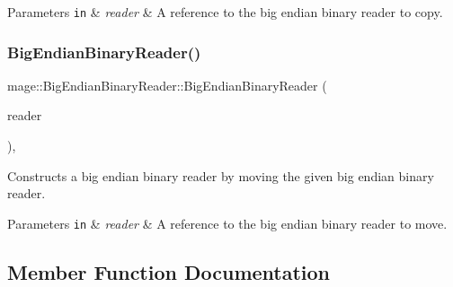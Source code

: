 \begin{DoxyParams}[1]{Parameters}
\mbox{\tt in}  & {\em reader} & A reference to the big endian binary reader to copy. \\
\hline
\end{DoxyParams}
\hypertarget{classmage_1_1_big_endian_binary_reader_a3cb2fbd205854cf69c36054a2003e80e}{}\label{classmage_1_1_big_endian_binary_reader_a3cb2fbd205854cf69c36054a2003e80e} 
\subsubsection{\texorpdfstring{Big\+Endian\+Binary\+Reader()}{BigEndianBinaryReader()}\hspace{0.1cm}{\footnotesize\ttfamily [3/3]}}
{\footnotesize\ttfamily mage\+::\+Big\+Endian\+Binary\+Reader\+::\+Big\+Endian\+Binary\+Reader (\begin{DoxyParamCaption}\item[{\hyperlink{classmage_1_1_big_endian_binary_reader}{Big\+Endian\+Binary\+Reader} \&\&}]{reader }\end{DoxyParamCaption})\hspace{0.3cm}{\ttfamily [protected]}, {\ttfamily [default]}}

Constructs a big endian binary reader by moving the given big endian binary reader.


\begin{DoxyParams}[1]{Parameters}
\mbox{\tt in}  & {\em reader} & A reference to the big endian binary reader to move. \\
\hline
\end{DoxyParams}


\subsection{Member Function Documentation}
\hypertarget{classmage_1_1_big_endian_binary_reader_a801558f27606dbc681809178aaaaacd1}{}\label{classmage_1_1_big_endian_binary_reader_a801558f27606dbc681809178aaaaacd1} 

